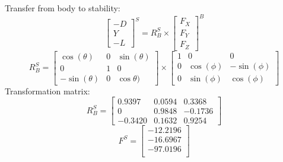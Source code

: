 Transfer from body to stability:
\newline
$$\begin{bmatrix}
	-D \\
	 Y \\
	-L
\end{bmatrix}^S = R_B^S \times
\begin{bmatrix}
	F_X \\
	F_Y \\
	F_Z
	\end{bmatrix}^B $$
$$R_B^S = 
\begin{bmatrix}
	\cos(\theta) & 0 & \sin(\theta)   \\
	0      & 1  &       0 \\
	-\sin(\theta) & 0 & \cos\theta)  
\end{bmatrix}
\times
\begin{bmatrix}
	1      & 0 &         0     \\
	0 & \cos(\phi) &  -\sin(\phi)   \\
	
	0 &  \sin(\phi) & \cos(\phi)  
	
\end{bmatrix} 
$$
Transformation matrix:
$$R_B^S = \begin{bmatrix}
	    0.9397   & 0.0594  &  0.3368 \\
	0  &  0.9848  & -0.1736 \\
	-0.3420  &  0.1632  &  0.9254
\end{bmatrix}$$
$$F^S = \begin{bmatrix}
	  -12.2196\\
	-16.6967\\
	-97.0196\\
\end{bmatrix}$$
